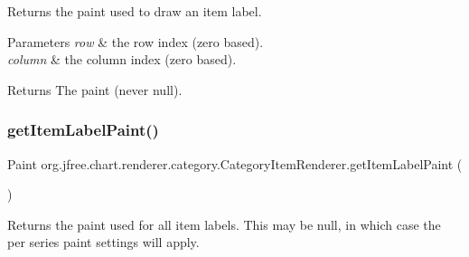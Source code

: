 Returns the paint used to draw an item label.


\begin{DoxyParams}{Parameters}
{\em row} & the row index (zero based). \\
\hline
{\em column} & the column index (zero based).\\
\hline
\end{DoxyParams}
\begin{DoxyReturn}{Returns}
The paint (never {\ttfamily null}). 
\end{DoxyReturn}
\mbox{\label{interfaceorg_1_1jfree_1_1chart_1_1renderer_1_1category_1_1_category_item_renderer_a78f5ae7abb9e7c55826dc6009ceb7839}} 
\subsubsection{\texorpdfstring{get\+Item\+Label\+Paint()}{getItemLabelPaint()}\hspace{0.1cm}{\footnotesize\ttfamily [2/2]}}
{\footnotesize\ttfamily Paint org.\+jfree.\+chart.\+renderer.\+category.\+Category\+Item\+Renderer.\+get\+Item\+Label\+Paint (\begin{DoxyParamCaption}{ }\end{DoxyParamCaption})}

Returns the paint used for all item labels. This may be {\ttfamily null}, in which case the per series paint settings will apply.

